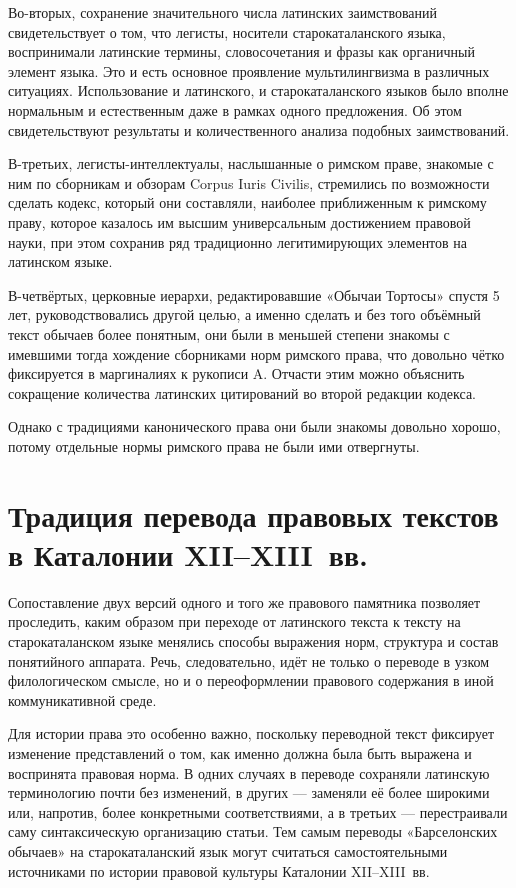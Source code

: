 Во-вторых, сохранение значительного числа латинских заимствований свидетельствует о том, что легисты, носители старокаталанского языка, воспринимали латинские термины, словосочетания и фразы как органичный элемент языка. Это и есть основное проявление мультилингвизма в различных ситуациях. Использование и латинского, и старокаталанского языков было вполне нормальным и естественным даже в рамках одного предложения. Об этом свидетельствуют результаты и количественного анализа подобных заимствований.

В-третьих, легисты-интеллектуалы, наслышанные о римском праве, знакомые с ним по сборникам и обзорам Corpus Iuris Civilis, стремились по возможности сделать кодекс, который они составляли, наиболее приближенным к римскому праву, которое казалось им высшим универсальным достижением правовой науки, при этом сохранив ряд традиционно легитимирующих элементов на латинском языке.

В-четвёртых, церковные иерархи, редактировавшие «Обычаи Тортосы» спустя 5 лет, руководствовались другой целью, а именно сделать и без того объёмный текст обычаев более понятным, они были в меньшей степени знакомы с имевшими тогда хождение сборниками норм римского права, что довольно чётко фиксируется в маргиналиях к рукописи A. Отчасти этим можно объяснить сокращение количества латинских цитирований во второй редакции кодекса.

Однако с традициями канонического права они были знакомы довольно хорошо, потому отдельные нормы римского права не были ими отвергнуты.

\section{Традиция перевода правовых текстов в Каталонии XII--XIII~вв.}

Сопоставление двух версий одного и того же правового памятника позволяет проследить, каким образом при переходе от латинского текста к тексту на старокаталанском языке менялись способы выражения норм, структура и состав понятийного аппарата. Речь, следовательно, идёт не только о переводе в узком филологическом смысле, но и о переоформлении правового содержания в иной коммуникативной среде.

Для истории права это особенно важно, поскольку переводной текст фиксирует изменение представлений о том, как именно должна была быть выражена и воспринята правовая норма. В одних случаях в переводе сохраняли латинскую терминологию почти без изменений, в других --- заменяли её более широкими или, напротив, более конкретными соответствиями, а в третьих --- перестраивали саму синтаксическую организацию статьи. Тем самым переводы «Барселонских обычаев» на старокаталанский язык могут считаться самостоятельными источниками по истории правовой культуры Каталонии XII--XIII~вв.

